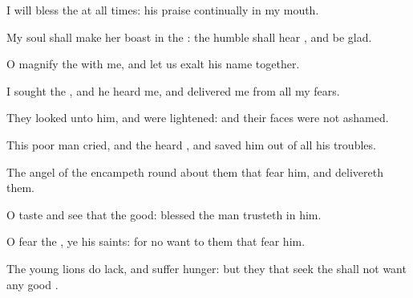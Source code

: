 {\Q {}I will
bless the
{} at all
times: his
praise
{}
continually
{} in my
mouth.


\par }{\Q {}My
soul shall make her
boast in the
{}: the
humble shall
hear
{}, and be
glad.


\par }{\Q {}O
magnify the
{} with me, and let us
exalt his
name
together.


\par }{\Q {}I
sought the
{}, and he
heard me, and
delivered me from all my
fears.


\par }{\Q {}They
looked unto him, and were
lightened: and their
faces were not
ashamed.


\par }{\Q {}This poor
man
cried, and the
{}
heard
{}, and
saved him out of all his
troubles.


\par }{\Q {}The
angel of the
{}
encampeth round
about them that
fear him, and
delivereth them.


\par }{\Q {}O
taste and
see that the
{}
{}
good:
blessed
{} the
man
{}
trusteth in him.


\par }{\Q {}O
fear the
{}, ye his
saints: for
{} no
want to them that
fear him.


\par }{\Q {}The young
lions do
lack, and suffer
hunger: but they that
seek the
{} shall not
want any
good
{}.


\par }{\BB \par }
